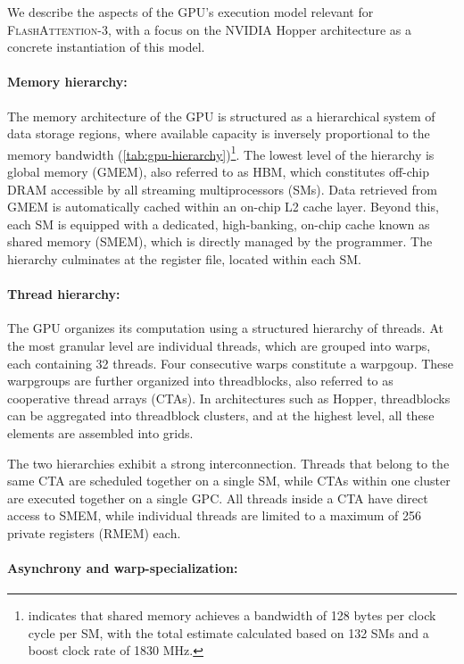 We describe the aspects of the GPU's execution model relevant for \textsc{FlashAttention-3}, with a focus on the NVIDIA Hopper architecture as a concrete instantiation of this model.

\paragraph{Memory hierarchy:} The memory architecture of the GPU is structured as a hierarchical system of data storage regions, where available capacity is inversely proportional to the memory bandwidth (\cref{tab:gpu-hierarchy})\footnote{\citet{luo2024benchmarking} indicates that shared memory achieves a bandwidth of 128 bytes per clock cycle per SM, with the total estimate calculated based on 132 SMs and a boost clock rate of 1830 MHz.}. The lowest level of the hierarchy is global memory (GMEM), also referred to as HBM, which constitutes off-chip DRAM accessible by all streaming multiprocessors (SMs). Data retrieved from GMEM is automatically cached within an on-chip L2 cache layer. Beyond this, each SM is equipped with a dedicated, high-banking, on-chip cache known as shared memory (SMEM), which is directly managed by the programmer. The hierarchy culminates at the register file, located within each SM.

\paragraph{Thread hierarchy:} The GPU organizes its computation using a structured hierarchy of threads. At the most granular level are individual threads, which are grouped into warps, each containing 32 threads. Four consecutive warps constitute a warpgoup. These warpgroups are further organized into threadblocks, also referred to as cooperative thread arrays (CTAs). In architectures such as Hopper, threadblocks can be aggregated into threadblock clusters, and at the highest level, all these elements are assembled into grids.

The two hierarchies exhibit a strong interconnection. Threads that belong to the same CTA are scheduled together on a single SM, while CTAs within one cluster are executed together on a single GPC. All threads inside a CTA have direct access to SMEM, while individual threads are limited to a maximum of 256 private registers (RMEM) each.

\paragraph{Asynchrony and warp-specialization:}

